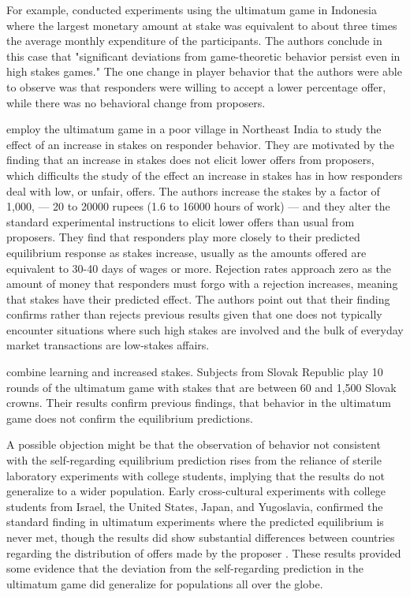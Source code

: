\documentclass[12pt]{article}
\begin{document}
For example, \cite{cameron1999raising} conducted experiments using the ultimatum game in Indonesia where the largest monetary amount at stake was equivalent to about three times the average monthly expenditure of the participants. The authors conclude in this case that "significant deviations from game-theoretic behavior persist even in high stakes games." The one change in player behavior that the authors were able to observe was that responders were willing to accept a lower percentage offer, while there was no behavioral change from proposers. 

\cite{andersen2011stakes} employ the ultimatum game in a poor village in Northeast India to study the effect of an increase in stakes on responder behavior. They are motivated by the finding that an increase in stakes does not elicit lower offers from proposers, which difficults the study of the effect an increase in stakes has in how responders deal with low, or unfair, offers. The authors increase the stakes by a factor of 1,000, --- 20 to 20000 rupees (1.6 to 16000 hours of work) --- and they alter the standard experimental instructions to elicit lower offers than usual from proposers. They find that responders play more closely to their predicted equilibrium response as stakes increase, usually as the amounts offered are equivalent to 30-40 days of wages or more. Rejection rates approach zero as the amount of money that responders must forgo with a rejection increases, meaning that stakes have their predicted effect. The authors point out that their finding confirms rather than rejects previous results given that one does not typically encounter situations where such high stakes are involved and the bulk of everyday market transactions are low-stakes affairs.


\cite{slonim1998learning} combine learning and increased stakes. Subjects from Slovak Republic play 10 rounds of the ultimatum game with stakes that are between 60 and 1,500 Slovak crowns. Their results confirm previous findings, that behavior in the ultimatum game does not confirm the equilibrium predictions. 

A possible objection might be that the observation of behavior not consistent with the self-regarding equilibrium prediction rises from the reliance of sterile laboratory experiments with college students, implying that the results do not generalize to a wider population. Early cross-cultural experiments with college students from Israel, the United States, Japan, and Yugoslavia, confirmed the standard finding in ultimatum experiments where the predicted equilibrium is never met, though the results did show substantial differences between countries regarding the distribution of offers made by the proposer \citep{roth1991}. These results provided some evidence that the deviation from the self-regarding prediction in the ultimatum game did generalize for populations all over the globe. 
\end{document}
